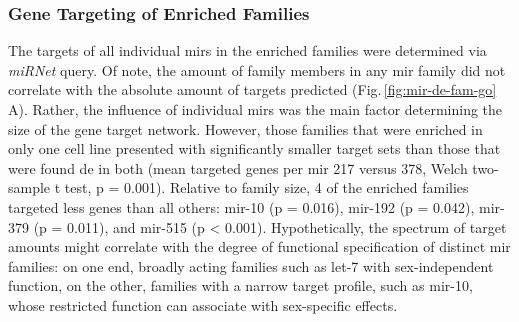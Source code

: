 \subsubsection{Gene Targeting of Enriched Families}
The targets of all individual \acp{mir} in the enriched families were determined via \textit{miRNet} query. Of note, the amount of family members in any \ac{mir} family did not correlate with the absolute amount of targets predicted (Fig.\,\ref{fig:mir-de-fam-go}\,A). Rather, the influence of individual \acp{mir} was the main factor determining the size of the gene target network. However, those families that were enriched in only one cell line presented with significantly smaller target sets than those that were found \ac{de} in both (mean targeted genes per \ac{mir} 217 versus 378, Welch two-sample t test, p = 0.001). Relative to family size, 4 of the enriched families targeted less genes than all others: mir-10 (p = 0.016), mir-192 (p = 0.042), mir-379 (p = 0.011), and mir-515 (p < 0.001). Hypothetically, the spectrum of target amounts might correlate with the degree of functional specification of distinct \ac{mir} families: on one end, broadly acting families such as let-7 with sex-independent function, on the other, families with a narrow target profile, such as mir-10, whose restricted function can associate with sex-specific effects.

